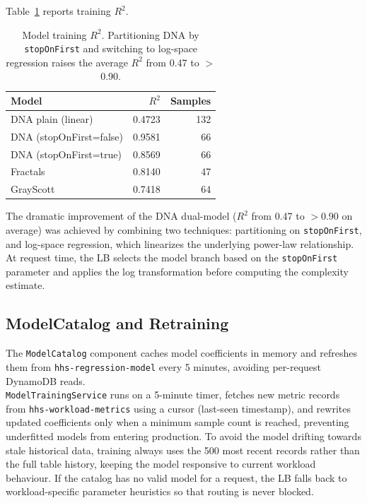 \documentclass[10pt]{article}
\begin{document}
Table~\ref{tab:r2} reports training $R^2$.

\begin{table}[h]
	\centering
	\small
	\begin{tabular}{lrr}
		\toprule
		Model                   & $R^2$  & Samples \\
		\midrule
		DNA plain (linear)      & 0.4723 & 132     \\
		DNA (stopOnFirst=false) & 0.9581 & 66      \\
		DNA (stopOnFirst=true)  & 0.8569 & 66      \\
		Fractals                & 0.8140 & 47      \\
		GrayScott               & 0.7418 & 64      \\
		\bottomrule
	\end{tabular}
	\caption{Model training $R^2$. Partitioning DNA by \texttt{stopOnFirst} and switching to log-space regression raises the average $R^2$ from 0.47 to $>$0.90.}
	\label{tab:r2}
\end{table}

The dramatic improvement of the DNA dual-model ($R^2$ from 0.47 to $>$0.90 on
average) was achieved by combining two techniques: partitioning on
\texttt{stopOnFirst}, and log-space regression, which linearizes the underlying
power-law relationship. At request time, the LB selects the model branch based on the
\texttt{stopOnFirst} parameter and applies the log transformation before
computing the complexity estimate.

\subsection{ModelCatalog and Retraining}
The \texttt{ModelCatalog} component caches model coefficients in memory and
refreshes them from \texttt{hhs-regression-model} every 5 minutes, avoiding
per-request DynamoDB reads.\\ \texttt{ModelTrainingService} runs on a 5-minute
timer, fetches new metric records from \texttt{hhs-workload-metrics} using a
cursor (last-seen timestamp), and rewrites updated coefficients only when a
minimum sample count is reached, preventing underfitted models from entering
production. To avoid the model drifting towards stale historical data, training
always uses the 500 most recent records rather than the full table history,
keeping the model responsive to current workload behaviour. If the catalog has no valid model for a request, the LB falls back
to workload-specific parameter heuristics so that routing is never blocked.
\end{document}
